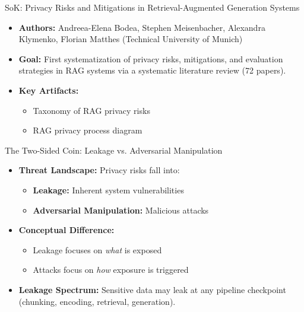 \documentclass[aspectratio=169,xcolor=dvipsnames]{beamer}
\begin{document}
	\begin{frame}{SoK: Privacy Risks and Mitigations in Retrieval-Augmented Generation Systems}
		
		\begin{itemize}
			\item \textbf{Authors:} Andreea-Elena Bodea, Stephen Meisenbacher, Alexandra Klymenko, Florian Matthes  
			(Technical University of Munich)
			
			\item \textbf{Goal:} First systematization of privacy risks, mitigations, and evaluation strategies in RAG systems via a systematic literature review (72 papers).
			
			\item \textbf{Key Artifacts:}
			\begin{itemize}
				\item Taxonomy of RAG privacy risks
				\item RAG privacy process diagram
			\end{itemize}
		\end{itemize}
		
	\end{frame}
	
	\begin{frame}{The Two-Sided Coin: Leakage vs. Adversarial Manipulation}
		
		\begin{itemize}
			\item \textbf{Threat Landscape:} Privacy risks fall into:
			\begin{itemize}
				\item \textbf{Leakage:} Inherent system vulnerabilities
				\item \textbf{Adversarial Manipulation:} Malicious attacks
			\end{itemize}
			
			\item \textbf{Conceptual Difference:}
			\begin{itemize}
				\item Leakage focuses on \emph{what} is exposed
				\item Attacks focus on \emph{how} exposure is triggered
			\end{itemize}
			
			\item \textbf{Leakage Spectrum:} Sensitive data may leak at any pipeline checkpoint (chunking, encoding, retrieval, generation).
		\end{itemize}
		
	\end{frame}
	
\end{document}
